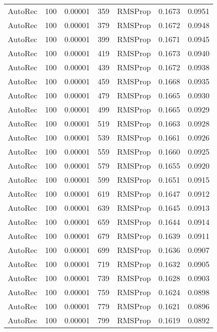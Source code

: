 \begin{tabular}{llrllrr}
 AutoRec &  100 &  0.00001 &   359 &   RMSProp &  0.1673 &       0.0951 \\
 AutoRec &  100 &  0.00001 &   379 &   RMSProp &  0.1672 &       0.0948 \\
 AutoRec &  100 &  0.00001 &   399 &   RMSProp &  0.1671 &       0.0945 \\
 AutoRec &  100 &  0.00001 &   419 &   RMSProp &  0.1673 &       0.0940 \\
 AutoRec &  100 &  0.00001 &   439 &   RMSProp &  0.1672 &       0.0938 \\
 AutoRec &  100 &  0.00001 &   459 &   RMSProp &  0.1668 &       0.0935 \\
 AutoRec &  100 &  0.00001 &   479 &   RMSProp &  0.1665 &       0.0930 \\
 AutoRec &  100 &  0.00001 &   499 &   RMSProp &  0.1665 &       0.0929 \\
 AutoRec &  100 &  0.00001 &   519 &   RMSProp &  0.1663 &       0.0928 \\
 AutoRec &  100 &  0.00001 &   539 &   RMSProp &  0.1661 &       0.0926 \\
 AutoRec &  100 &  0.00001 &   559 &   RMSProp &  0.1660 &       0.0925 \\
 AutoRec &  100 &  0.00001 &   579 &   RMSProp &  0.1655 &       0.0920 \\
 AutoRec &  100 &  0.00001 &   599 &   RMSProp &  0.1651 &       0.0915 \\
 AutoRec &  100 &  0.00001 &   619 &   RMSProp &  0.1647 &       0.0912 \\
 AutoRec &  100 &  0.00001 &   639 &   RMSProp &  0.1645 &       0.0913 \\
 AutoRec &  100 &  0.00001 &   659 &   RMSProp &  0.1644 &       0.0914 \\
 AutoRec &  100 &  0.00001 &   679 &   RMSProp &  0.1639 &       0.0911 \\
 AutoRec &  100 &  0.00001 &   699 &   RMSProp &  0.1636 &       0.0907 \\
 AutoRec &  100 &  0.00001 &   719 &   RMSProp &  0.1632 &       0.0905 \\
 AutoRec &  100 &  0.00001 &   739 &   RMSProp &  0.1628 &       0.0903 \\
 AutoRec &  100 &  0.00001 &   759 &   RMSProp &  0.1624 &       0.0898 \\
 AutoRec &  100 &  0.00001 &   779 &   RMSProp &  0.1621 &       0.0896 \\
 AutoRec &  100 &  0.00001 &   799 &   RMSProp &  0.1619 &       0.0892 \\

\end{tabular}
